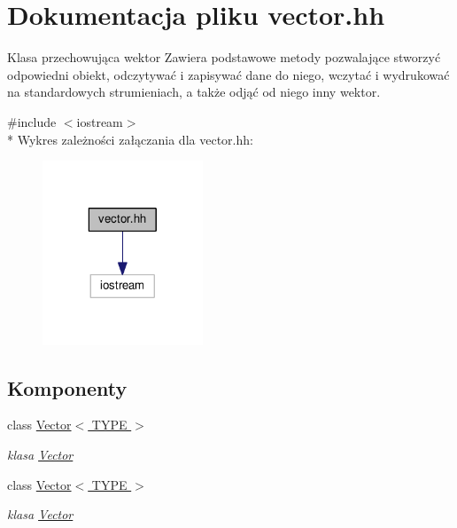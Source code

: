 \hypertarget{vector_8hh}{}\section{Dokumentacja pliku vector.\+hh}
\label{vector_8hh}


Klasa przechowująca wektor Zawiera podstawowe metody pozwalające stworzyć odpowiedni obiekt, odczytywać i zapisywać dane do niego, wczytać i wydrukować na standardowych strumieniach, a także odjąć od niego inny wektor.  


{\ttfamily \#include $<$iostream$>$}\\*
Wykres zależności załączania dla vector.\+hh\+:\nopagebreak
\begin{figure}[H]
\begin{center}
\leavevmode
\includegraphics[width=136pt]{vector_8hh__incl}
\end{center}
\end{figure}
\subsection*{Komponenty}
\begin{DoxyCompactItemize}
\item 
class \hyperlink{class_vector}{Vector$<$ T\+Y\+P\+E $>$}
\begin{DoxyCompactList}\small\item\em klasa \hyperlink{class_vector}{Vector} \end{DoxyCompactList}\item 
class \hyperlink{class_vector}{Vector$<$ T\+Y\+P\+E $>$}
\begin{DoxyCompactList}\small\item\em klasa \hyperlink{class_vector}{Vector} \end{DoxyCompactList}\end{DoxyCompactItemize}

